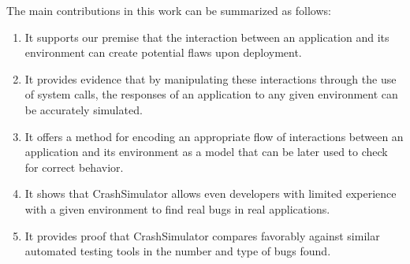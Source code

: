 The main contributions in this work can be summarized as follows:

\begin{enumerate}

\item{It supports our premise that the interaction between an application
and its environment can create potential flaws upon deployment.}

\item{It provides evidence that by manipulating these interactions through
the use of system calls, the responses of an application to any given
environment can be accurately simulated.}

\item{It offers a method for encoding an appropriate flow of
interactions between an application and its environment as a model that
can be later used to check for correct behavior.}

\item{It shows that CrashSimulator allows even developers with limited
experience with a given environment to find real bugs in
real applications.}

\item{It provides proof that CrashSimulator compares favorably against
similar automated testing tools in the number and type of bugs found.}

\end{enumerate}

